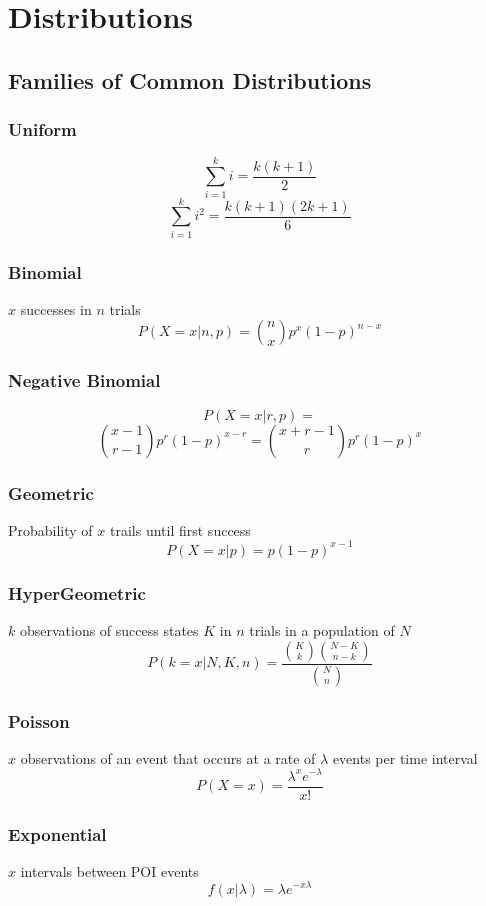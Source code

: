 \section{Distributions}
	\subsection*{Families of Common Distributions}
		\subsubsection*{Uniform}
			\[ \sum_{i=1}^{k} i = \frac{k(k+1)}{2} \]
			\[ \sum_{i=1}^{k} i^2 = \frac{k(k+1)(2k+1)}{6} \]
		
		\subsubsection*{Binomial}
			\(x\) successes in \(n\) trials
			\[ P(X=x|n,p) = \binom{n}{x}p^x(1-p)^{n-x}\]
		
		\subsubsection*{Negative Binomial}
			\[P(X=x|r,p) =  \] \[ \binom{x-1}{r-1}p^r(1-p)^{x-r} = \binom{x+r-1}{r}p^r(1-p)^{x} \]
		
		\subsubsection*{Geometric}
			Probability of \(x\) trails until first success
			\[P(X=x|p) = p(1-p)^{x-1}\]
			
		\subsubsection*{HyperGeometric}
			\(k\) observations of success states \(K\)
			in \(n\) trials in a population of \(N\)
			\[P(k=x|N,K,n) = \frac{\binom{K}{k}\binom{N-K}{n-k}}{\binom{N}{n}}\]
		
		\subsubsection*{Poisson}
			\(x\) observations of an event that occurs at a rate of \(\lambda\) events per time interval
			\[P(X=x) = \frac{\lambda^xe^{-\lambda}}{x!}\]
			
		\subsubsection*{Exponential}
			\(x\) intervals between POI events
			\[f(x|\lambda) = \lambda e^{-x\lambda}\]
		
